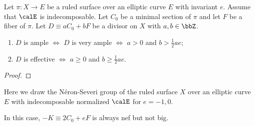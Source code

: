     \begin{theorem}\label{thm:positivity_of_divisors_on_indecomposable_ruled_surface_over_elliptic_curve}
        Let \(\pi:X \to E\) be a ruled surface over an elliptic curve \(E\) with invariant \(e\).
        Assume that \(\calE\) is indecomposable.
        Let \(C_0\) be a minimal section of \(\pi\) and let \(F\) be a fiber of \(\pi\). 
        Let \(D \equiv aC_0 + bF\) be a divisor on \(X\) with \(a,b \in \bbZ\).
        \begin{enumerate}
            \item \(D\) is ample \(\iff\) \(D\) is very ample \(\iff\) \(a > 0\) and \(b > \frac{1}{2}ae\);
            \item \(D\) is effective \(\iff\) \(a \geq 0\) and \(b \geq \frac{1}{2}ae\).
        \end{enumerate}
    \end{theorem}
    \begin{proof}
    \end{proof}

    \begin{example}\label{eg:Neron_Severi_group_of_indecomposable_ruled_surface_over_elliptic_curve}
        Here we draw the N\'eron-Severi group of the ruled surface \(X\) over an elliptic curve \(E\) with indecomposable normalized \(\calE\) for \(e = -1,0\).
        \begin{center}
        \end{center}
        In this case, \(-K\equiv 2C_0 + eF\) is always nef but not big.
    \end{example}

